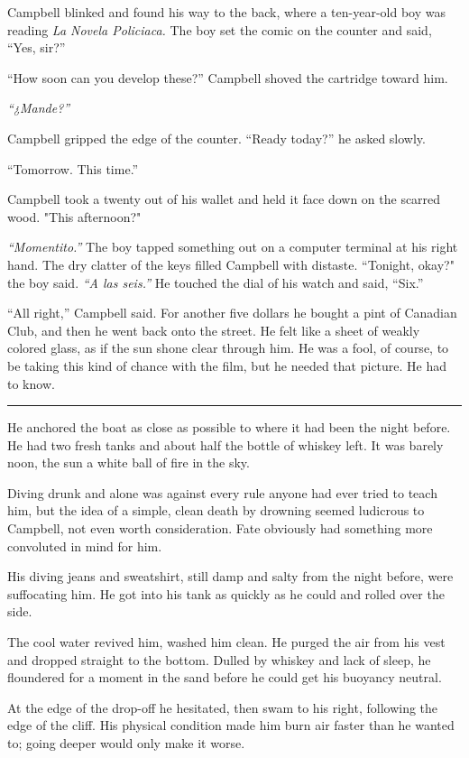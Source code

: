 Campbell blinked and found his way to the back, where a ten-year-old boy was reading \textit{La Novela Policiaca.} The boy set the comic on the counter and said, ``Yes, sir?''

``How soon can you develop these?'' Campbell shoved the cartridge toward him.

\textit{``¿Mande?''}

Campbell gripped the edge of the counter. ``Ready today?'' he asked slowly.

``Tomorrow. This time.''

Campbell took a twenty out of his wallet and held it face down on the scarred wood. "This afternoon?"

\textit{``Momentito.''} The boy tapped something out on a computer terminal at his right hand. The dry clatter of the keys filled Campbell with distaste. ``Tonight, okay?" the boy said. \textit{``A las seis.''} He touched the dial of his watch and said, ``Six.''

``All right,'' Campbell said. For another five dollars he bought a pint of Canadian Club, and then he went back onto the street. He felt like a sheet of weakly colored glass, as if the sun shone clear through him. He was a fool, of course, to be taking this kind of chance with the film, but he needed that picture. He had to know.

\fancybreak{* * *}

He anchored the boat as close as possible to where it had been the night before. He had two fresh tanks and about half the bottle of whiskey left. It was barely noon, the sun a white ball of fire in the sky.

Diving drunk and alone was against every rule anyone had ever tried to teach him, but the idea of a simple, clean death by drowning seemed ludicrous to Campbell, not even worth consideration. Fate obviously had something more convoluted in mind for him.

His diving jeans and sweatshirt, still damp and salty from the night before, were suffocating him. He got into his tank as quickly as he could and rolled over the side.

The cool water revived him, washed him clean. He purged the air from his vest and dropped straight to the bottom. Dulled by whiskey and lack of sleep, he floundered for a moment in the sand before he could get his buoyancy neutral.

At the edge of the drop-off he hesitated, then swam to his right, following the edge of the cliff. His physical condition made him burn air faster than he wanted to; going deeper would only make it worse.

